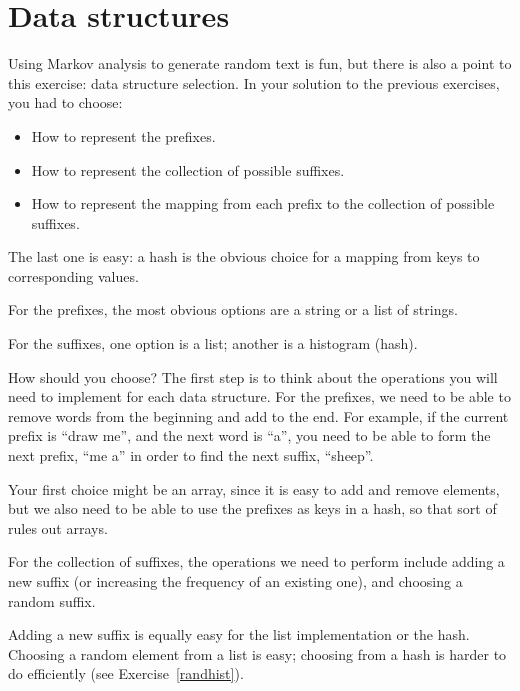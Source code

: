 \section{Data structures}

Using Markov analysis to generate random text is fun, but there is
also a point to this exercise: data structure selection.  In your
solution to the previous exercises, you had to choose:

\begin{itemize}

\item How to represent the prefixes.

\item How to represent the collection of possible suffixes.

\item How to represent the mapping from each prefix to
the collection of possible suffixes.

\end{itemize}

The last one is easy: a hash is the obvious choice
for a mapping from keys to corresponding values.

For the prefixes, the most obvious options are a string or
a list of strings.

For the suffixes,
one option is a list; another is a histogram (hash).

How should you choose?  The first step is to think about
the operations you will need to implement for each data structure.
For the prefixes, we need to be able to remove words from
the beginning and add to the end.  For example, if the current
prefix is ``draw me'', and the next word is ``a'', you need
to be able to form the next prefix, ``me a'' in order to find 
the next suffix, ``sheep''.

Your first choice might be an array, since it is easy to add
and remove elements, but we also need to be able to use the
prefixes as keys in a hash, so that sort of rules out arrays.

For the collection of suffixes, the operations we need to
perform include adding a new suffix (or increasing the frequency
of an existing one), and choosing a random suffix.

Adding a new suffix is equally easy for the list implementation
or the hash.  Choosing a random element from a list
is easy; choosing from a hash is harder to do
efficiently (see Exercise~\ref{randhist}).

